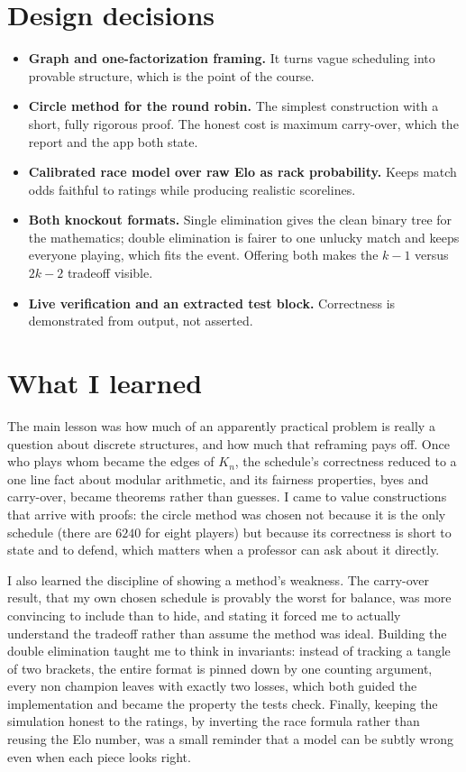 \documentclass[11pt]{article}
\begin{document}
\section{Design decisions}

\begin{itemize}[nosep,leftmargin=1.4em]
  \item \textbf{Graph and one-factorization framing.} It turns vague scheduling into
        provable structure, which is the point of the course.
  \item \textbf{Circle method for the round robin.} The simplest construction with a
        short, fully rigorous proof. The honest cost is maximum carry-over, which the
        report and the app both state.
  \item \textbf{Calibrated race model over raw Elo as rack probability.} Keeps match
        odds faithful to ratings while producing realistic scorelines.
  \item \textbf{Both knockout formats.} Single elimination gives the clean binary
        tree for the mathematics; double elimination is fairer to one unlucky match
        and keeps everyone playing, which fits the event. Offering both makes the
        $k-1$ versus $2k-2$ tradeoff visible.
  \item \textbf{Live verification and an extracted test block.} Correctness is
        demonstrated from output, not asserted.
\end{itemize}

\section{What I learned}

The main lesson was how much of an apparently practical problem is really a question
about discrete structures, and how much that reframing pays off. Once who plays whom
became the edges of $K_n$, the schedule's correctness reduced to a one line fact
about modular arithmetic, and its fairness properties, byes and carry-over, became
theorems rather than guesses. I came to value constructions that arrive with proofs:
the circle method was chosen not because it is the only schedule (there are $6240$
for eight players) but because its correctness is short to state and to defend, which
matters when a professor can ask about it directly.

I also learned the discipline of showing a method's weakness. The carry-over result,
that my own chosen schedule is provably the worst for balance, was more convincing to
include than to hide, and stating it forced me to actually understand the tradeoff
rather than assume the method was ideal. Building the double elimination taught me to
think in invariants: instead of tracking a tangle of two brackets, the entire format
is pinned down by one counting argument, every non champion leaves with exactly two
losses, which both guided the implementation and became the property the tests check.
Finally, keeping the simulation honest to the ratings, by inverting the race formula
rather than reusing the Elo number, was a small reminder that a model can be subtly
wrong even when each piece looks right.
\end{document}
